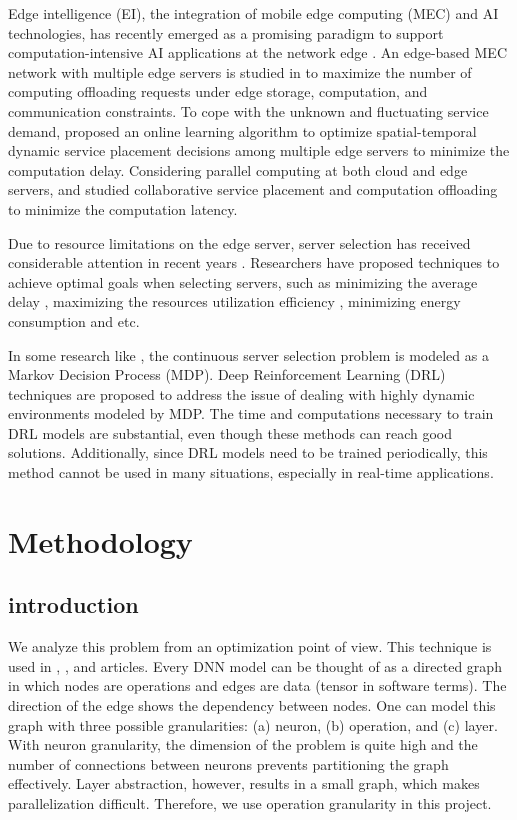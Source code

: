 \documentclass[lettersize,journal]{IEEEtran}
\begin{document}
Edge intelligence (EI), the integration of mobile edge computing (MEC) and AI technologies, has recently emerged as a promising paradigm to support computation-intensive AI applications at the network edge \cite{9442308}.
An edge-based MEC network with multiple edge servers is studied in \cite{8737385} to maximize the number of computing offloading requests under edge storage, computation, and communication constraints. To cope with the unknown and fluctuating service demand,\cite{8509631} proposed an online learning algorithm to optimize spatial-temporal dynamic service placement decisions among multiple edge servers to minimize the computation delay. Considering parallel computing at both cloud and edge servers, \cite{xu2018joint} and \cite{chen2019collaborative} studied collaborative service placement and computation offloading to minimize the computation latency.

Due to resource limitations on the edge server, server selection has received considerable attention in recent years \cite{9599379}. 
Researchers have proposed techniques to achieve optimal goals when selecting servers, such as minimizing the average delay \cite{8972932},
maximizing the resources utilization efficiency \cite{8823875}, minimizing energy consumption \cite{li2020energy} and etc.

In some research like \cite{liu2021deep}, the continuous server selection problem is modeled as a Markov Decision Process (MDP). Deep Reinforcement Learning (DRL) techniques are proposed to address the issue of dealing with highly dynamic environments modeled by MDP. The time and computations necessary to train DRL models are substantial, even though these methods can reach good solutions.  Additionally, since DRL models need to be trained periodically, this method cannot be used in many situations, especially in real-time applications. 

\section{Methodology}
\subsection{introduction}
We analyze this problem from an optimization point of view. This technique is used in \cite{DBLP:journals/corr/abs-2006-16423}, \cite{9527097}, and \cite{9512507} articles. Every DNN model can be thought of as a directed graph in which nodes are operations and edges are data (tensor in software terms). The direction of the edge shows the dependency between nodes. One can model this graph with three possible granularities: (a) neuron, (b) operation, and (c) layer. With neuron granularity, the dimension of the problem is quite high and the number of connections between neurons prevents partitioning the graph effectively. Layer abstraction, however, results in a small graph, which makes parallelization difficult. Therefore, we use operation granularity in this project. 
\end{document}
